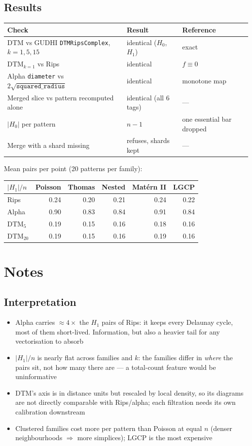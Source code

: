 \documentclass[11pt]{article}
\begin{document}
\subsection*{Results}
{\small
\begin{tabular}{@{}lll@{}}
\toprule
Check & Result & Reference \\
\midrule
DTM vs GUDHI \texttt{DTMRipsComplex}, $k=1,5,15$ & identical ($H_0$, $H_1$) & exact \\
DTM$_{k=1}$ vs Rips & identical & $f\equiv0$ \\
Alpha \texttt{diameter} vs $2\sqrt{\texttt{squared\_radius}}$ & identical & monotone map \\
Merged slice vs pattern recomputed alone & identical (all 6 tags) & --- \\
$|H_0|$ per pattern & $n-1$ & one essential bar dropped \\
Merge with a shard missing & refuses, shards kept & --- \\
\bottomrule
\end{tabular}}

\medskip
Mean pairs per point (20 patterns per family):

\smallskip
\begin{tabular}{@{}lrrrrr@{}}
\toprule
$|H_1|/n$ & Poisson & Thomas & Nested & Mat\'ern II & LGCP \\
\midrule
Rips        & 0.24 & 0.20 & 0.21 & 0.24 & 0.22 \\
Alpha       & 0.90 & 0.83 & 0.84 & 0.91 & 0.84 \\
DTM$_{5}$   & 0.19 & 0.15 & 0.16 & 0.18 & 0.16 \\
DTM$_{20}$  & 0.19 & 0.15 & 0.16 & 0.19 & 0.16 \\
\bottomrule
\end{tabular}

\section{Notes}

\subsection*{Interpretation}
\begin{itemize}
  \item Alpha carries $\approx4\times$ the $H_1$ pairs of Rips: it keeps every Delaunay cycle, most of them short-lived. Information, but also a heavier tail for any vectorisation to absorb
  \item $|H_1|/n$ is nearly flat across families and $k$: the families differ in \emph{where} the pairs sit, not how many there are --- a total-count feature would be uninformative
  \item DTM's axis is in distance units but rescaled by local density, so its diagrams are not directly comparable with Rips/alpha; each filtration needs its own calibration downstream
  \item Clustered families cost more per pattern than Poisson at equal $n$ (denser neighbourhoods $\Rightarrow$ more simplices); LGCP is the most expensive
\end{itemize}
\end{document}
